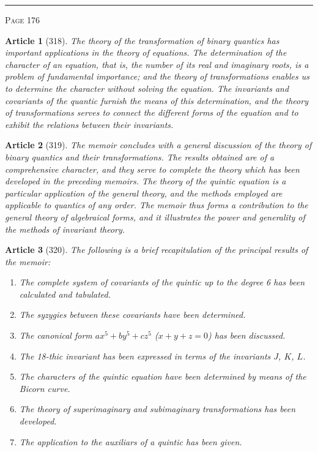 \documentclass[11pt,a4paper]{article}
\theoremstyle{cayley}
\newtheorem{art}{Article}
\begin{document}
\vspace{1em}
\noindent\rule{\textwidth}{0.4pt}
\begin{center}\textsc{Page 176}\end{center}
\newpage

\begin{art}[318]
The theory of the transformation of binary quantics has important applications in the theory of equations. The determination of the character of an equation, that is, the number of its real and imaginary roots, is a problem of fundamental importance; and the theory of transformations enables us to determine the character without solving the equation. The invariants and covariants of the quantic furnish the means of this determination, and the theory of transformations serves to connect the different forms of the equation and to exhibit the relations between their invariants.
\end{art}

\begin{art}[319]
The memoir concludes with a general discussion of the theory of binary quantics and their transformations. The results obtained are of a comprehensive character, and they serve to complete the theory which has been developed in the preceding memoirs. The theory of the quintic equation is a particular application of the general theory, and the methods employed are applicable to quantics of any order. The memoir thus forms a contribution to the general theory of algebraical forms, and it illustrates the power and generality of the methods of invariant theory.
\end{art}

\begin{art}[320]
The following is a brief recapitulation of the principal results of the memoir:
\begin{enumerate}[label=\arabic*.,itemsep=2pt]
\item The complete system of covariants of the quintic up to the degree 6 has been calculated and tabulated.
\item The syzygies between these covariants have been determined.
\item The canonical form $ax^5 + by^5 + cz^5$ ($x+y+z=0$) has been discussed.
\item The 18-thic invariant has been expressed in terms of the invariants $J$, $K$, $L$.
\item The characters of the quintic equation have been determined by means of the Bicorn curve.
\item The theory of superimaginary and subimaginary transformations has been developed.
\item The application to the auxiliars of a quintic has been given.
\end{enumerate}
\end{art}
\end{document}
